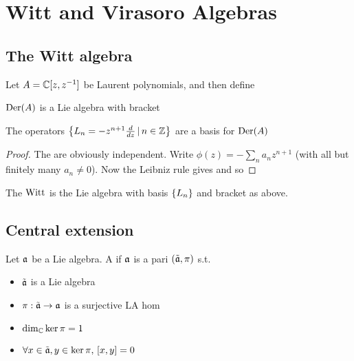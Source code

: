 \documentclass{article}
\begin{document}
\section{Witt and Virasoro Algebras}

\subsection{The Witt algebra}
Let $A = \mbb{C}[z,z^{-1}]$ be Laurent polynomials, and then define

\begin{prop}
$\Der(A)$ is a Lie algebra with bracket 
\end{prop}

\begin{prop}
The operators $\pbrace{L_n = - z^{n+1} \frac{d}{dz} \, | \, n \in \mbb{Z}}$ are a basis for $\Der(A)$
\end{prop}
\begin{proof}
The are obviously independent. Write $\phi(z) = -\sum_n a_n z^{n+1}$ (with all but finitely many $a_n \neq 0$). Now the Leibniz rule gives 
and so 
\end{proof}

\begin{definition}
The  $\Witt$ is the Lie algebra with basis $\pbrace{L_n}$ and bracket as above. 
\end{definition}

\subsection{Central extension}

\begin{definition}
Let $\mf{a}$ be a Lie algebra. A  if $\mf{a}$ is a pari $(\tilde{\mf{a}},\pi)$ s.t. 
\begin{itemize}
    \item $\tilde{\mf{a}}$ is a Lie algebra
    \item $\pi : \tilde{\mf{a}} \to \mf{a}$ is a surjective LA hom 
    \item $\dim_\mbb{C} \ker \pi = 1 $
    \item $\forall x \in \tilde{\mf{a}}, y \in \ker\pi, \, \comm[x]{y} = 0$
\end{itemize}
\end{definition}
\end{document}
